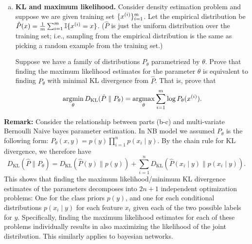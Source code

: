 \documentclass[12pt,letterpaper,boxed]{hmcpset}
\newcommand{\ind}[1]{\mathbb{I}\{#1\}}
\DeclareMathOperator*{\argmax}{argmax}
\DeclareMathOperator*{\argmin}{argmin}
\newcommand{\DKL}[2]{D_{\mathrm{KL}}(#1 \parallel #2)}
\begin{document}
\begin{solution}
\begin{enumerate}[(a)]
    \item \textbf{KL and maximum likelihood.} Consider density estimation problem and suppose we are given training set $\{\xx\}_{i=1}^m$. Let the empirical distribution be $\hat P(x) = \frac{1}{m} \sum_{i=1}^{m} \ind{\xx = x}$. ($\hat P$ is just the uniform distribution over the training set; i.e., sampling from the empirical distribution is the same as picking a random example from the training set.)
    
    Suppose we have a family of distributions $P_\theta$ parametriezd by $\theta$. Prove that finding the maximum likelihood estimates for the parameter $\theta$ is equivalent to finding $P_\theta$ with minimal KL divergence from $\hat P$. That is, prove that
    \[
    \argmin_\theta \DKL{\hat P}{P_\theta} = \argmax_\theta \sum_{i=1}^m \log P_\theta (\xx).
    \]

  \end{enumerate}

  \begin{remark}
    \textbf{Remark:} Consider the relationship between parts (b-c) and multi-variate Bernoulli Naive bayes parameter estimation. In NB model we assumed $P_\theta$ is the following form: $P_\theta(x,y) = p(y) \prod_{i=1}^n p(x_i \mid y)$. By the chain rule for KL divergence, we therefore have  
    \[
    \DKL{\hat P}{P_\theta} = \DKL{\hat P(y)}{p(y)} + \sum_{i=1}^n \DKL{\hat P(x_i \mid y)}{p(x_i \mid y)}.
    \]
    This shows that finding the maximum likelihood/minimum KL divergence estimates of the parameters decomposes into $2n+1$ independent optimization problems: One for the class priors $p(y)$, and one for each conditional distributions $p(x_i \mid y)$ for each feature $x_i$ given each of the two possible labels for $y$. Specifically, finding the maximum likelihood estimates for each of these problems individually results in also maximizing the likelihood of the joint distribution. This similarly applies to bayesian networks.
  \end{remark}
\end{solution}
\end{document}
